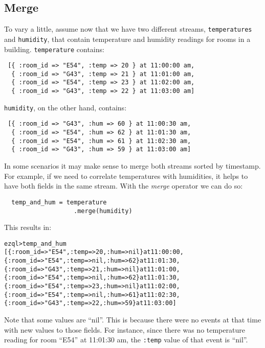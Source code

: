 \documentclass{report}
\newenvironment{evaluation}
{
  \framed
  \begin{alltt}
}
{
  \end{alltt}
  \endframed
}
\begin{document}
\subsection{Merge}
\label{sec:merge}

To vary a little, assume now that we have two different streams,
\verb=temperatures= and \verb=humidity=, that contain temperature and
humidity readings for rooms in a building. \verb=temperature= contains:

\begin{verbatim}
 [{ :room_id => "E54", :temp => 20 } at 11:00:00 am,
  { :room_id => "G43", :temp => 21 } at 11:01:00 am,
  { :room_id => "E54", :temp => 23 } at 11:02:00 am,
  { :room_id => "G43", :temp => 22 } at 11:03:00 am]
\end{verbatim}

\verb=humidity=, on the other hand, contains:

\begin{verbatim}
 [{ :room_id => "G43", :hum => 60 } at 11:00:30 am,
  { :room_id => "E54", :hum => 62 } at 11:01:30 am,
  { :room_id => "E54", :hum => 61 } at 11:02:30 am,
  { :room_id => "G43", :hum => 59 } at 11:03:00 am]
\end{verbatim}

In some scenarios it may make sense to merge both streams sorted by
timestamp. For example, if we need to correlate temperatures with
humidities, it helps to have both fields in the same stream. With the
\emph{merge} operator we can do so:

\begin{verbatim}
  temp_and_hum = temperature
                   .merge(humidity)
\end{verbatim}

This results in:

\begin{evaluation}
ezql> temp_and_hum
[\{ :room_id => "E54", :temp =>  20, :hum => nil \} at 11:00:00,
 \{ :room_id => "E54", :temp => nil, :hum =>  62 \} at 11:01:30,
 \{ :room_id => "G43", :temp =>  21, :hum => nil \} at 11:01:00,
 \{ :room_id => "E54", :temp => nil, :hum =>  62 \} at 11:01:30,
 \{ :room_id => "E54", :temp =>  23, :hum => nil \} at 11:02:00,
 \{ :room_id => "E54", :temp => nil, :hum =>  61 \} at 11:02:30,
 \{ :room_id => "G43", :temp =>  22, :hum =>  59 \} at 11:03:00]
\end{evaluation}

Note that some values are ``nil''. This is because there were no
events at that time with new values to those fields. For instance,
since there was no temperature reading for room ``E54'' at 11:01:30
am, the \verb=:temp= value of that event is ``nil''.
\end{document}
